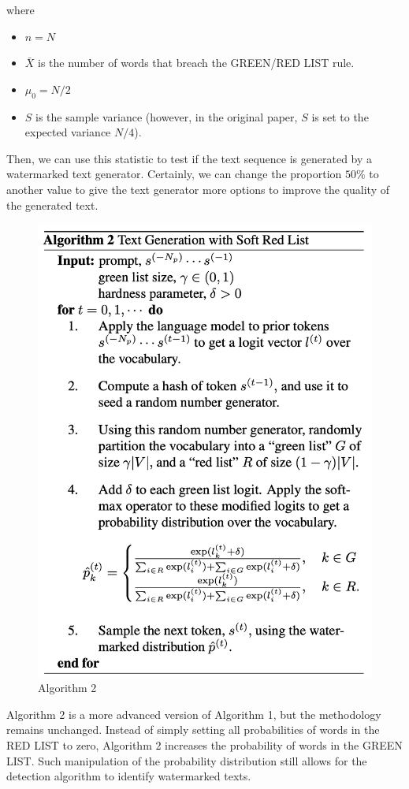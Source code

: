 \documentclass{article}
\begin{document}
where
\begin{itemize}
	\item $ n = N $
	\item $\bar{X}$ is the number of words that breach the GREEN/RED LIST rule.
	\item $\mu_0 = N/2$
	\item $S$ is the sample variance (however, in the original paper, $S$ is set to the expected variance $N/4$).
\end{itemize}

Then, we can use this statistic to test if the text sequence is generated by a watermarked text generator. Certainly, we can change the proportion $ 50\% $ to another value to give the text generator more options to improve the quality of the generated text.

\begin{figure}[H]
	\centering
	\includegraphics[width=1.0\linewidth]{images/watermark_2}
	\caption{Algorithm 2}
	\label{fig:watermark2}
\end{figure}
Algorithm 2 is a more advanced version of Algorithm 1, but the methodology remains unchanged. Instead of simply setting all probabilities of words in the RED LIST to zero, Algorithm 2 increases the probability of words in the GREEN LIST. Such manipulation of the probability distribution still allows for the detection algorithm to identify watermarked texts.\\
\end{document}
